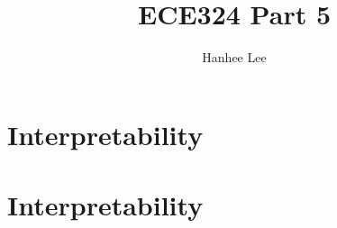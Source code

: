 \documentclass{article}
\title{ECE324 Part 5}
\author{Hanhee Lee}
\begin{document}
\section{Interpretability}

\newpage

\section{Interpretability}

\end{document}
